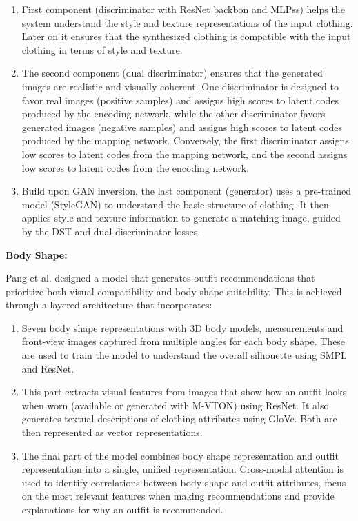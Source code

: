 \begin{enumerate}
  \item First component (discriminator with \acs{ResNet} backbon and \acsp{MLPs}) helps the system understand the style and texture representations of the input clothing. Later on it ensures that the synthesized clothing is compatible with the input clothing in terms of style and texture.
  \item The second component (dual discriminator) ensures that the generated images are realistic and visually coherent. One discriminator is designed to favor real images (positive samples) and assigns high scores to latent codes produced by the encoding network, while the other discriminator favors generated images (negative samples) and assigns high scores to latent codes produced by the mapping network. Conversely, the first discriminator assigns low scores to latent codes from the mapping network, and the second assigns low scores to latent codes from the encoding network.
  \item Build upon \acs{GAN} inversion, the last component (generator) uses a pre-trained model (StyleGAN) to understand the basic structure of clothing. It then applies style and texture information to generate a matching image, guided by the DST and dual discriminator losses.
\end{enumerate}

\vspace{0.5cm}

\textbf{Body Shape:}

\vspace{0.5cm}

Pang et al. designed a model that generates outfit recommendations that prioritize both visual compatibility and body shape suitability. This is achieved through a layered architecture that incorporates: \cite[cf.]{pang_learning_2024}

\begin{enumerate}
  \item Seven body shape representations with 3D body models, measurements and front-view images captured from multiple angles for each body shape. These are used to train the model to understand the overall silhouette using \acs{SMPL} and \acs{ResNet}.
  \item This part extracts visual features from images that show how an outfit looks when worn (available or generated with M-VTON) using \acs{ResNet}. It also generates textual descriptions of clothing attributes using \acs{GloVe}. Both are then represented as vector representations.
  \item The final part of the model combines body shape representation and outfit representation into a single, unified representation. Cross-modal attention is used to identify correlations between body shape and outfit attributes, focus on the most relevant features when making recommendations and provide explanations for why an outfit is recommended.
\end{enumerate}

